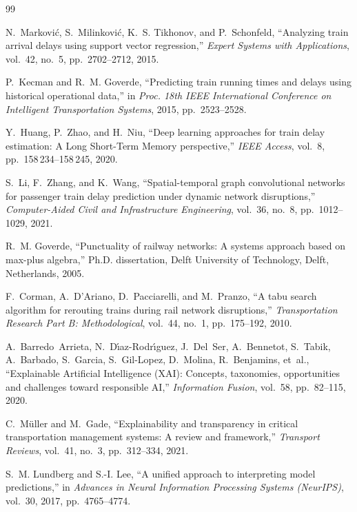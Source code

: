 \documentclass[11pt,a4paper]{article}
\renewenvironment{thebibliography}[1]{
  \begin{oldthebibliography}{#1}
    \setlength{\itemsep}{0.15em}
    \setlength{\parskip}{0em}
}
{
  \end{oldthebibliography}
}
\begin{document}
\begin{thebibliography}{99}
N.~Markovi{\'c}, S.~Milinkovi{\'c}, K.~S. Tikhonov, and P.~Schonfeld, ``Analyzing train arrival delays using support vector regression,'' \emph{Expert Systems with Applications}, vol.~42, no.~5, pp.~2702--2712, 2015.

P.~Kecman and R.~M. Goverde, ``Predicting train running times and delays using historical operational data,'' in \emph{Proc. 18th IEEE International Conference on Intelligent Transportation Systems}, 2015, pp.~2523--2528.

Y.~Huang, P.~Zhao, and H.~Niu, ``Deep learning approaches for train delay estimation: A Long Short-Term Memory perspective,'' \emph{IEEE Access}, vol.~8, pp.~158\,234--158\,245, 2020.

S.~Li, F.~Zhang, and K.~Wang, ``Spatial-temporal graph convolutional networks for passenger train delay prediction under dynamic network disruptions,'' \emph{Computer-Aided Civil and Infrastructure Engineering}, vol.~36, no.~8, pp.~1012--1029, 2021.

R.~M. Goverde, ``Punctuality of railway networks: A systems approach based on max-plus algebra,'' Ph.D. dissertation, Delft University of Technology, Delft, Netherlands, 2005.

F.~Corman, A.~D'Ariano, D.~Pacciarelli, and M.~Pranzo, ``A tabu search algorithm for rerouting trains during rail network disruptions,'' \emph{Transportation Research Part B: Methodological}, vol.~44, no.~1, pp.~175--192, 2010.

A.~Barredo~Arrieta, N.~D{\'\i}az-Rodr{\'\i}guez, J.~Del~Ser, A.~Bennetot, S.~Tabik, A.~Barbado, S.~Garcia, S.~Gil-Lopez, D.~Molina, R.~Benjamins, et~al., ``Explainable Artificial Intelligence (XAI): Concepts, taxonomies, opportunities and challenges toward responsible AI,'' \emph{Information Fusion}, vol.~58, pp.~82--115, 2020.

C.~M{\"u}ller and M.~Gade, ``Explainability and transparency in critical transportation management systems: A review and framework,'' \emph{Transport Reviews}, vol.~41, no.~3, pp.~312--334, 2021.

S.~M. Lundberg and S.-I. Lee, ``A unified approach to interpreting model predictions,'' in \emph{Advances in Neural Information Processing Systems (NeurIPS)}, vol.~30, 2017, pp.~4765--4774.


\end{thebibliography}
\end{document}
